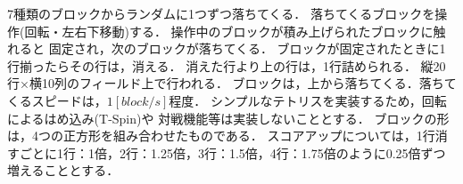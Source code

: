 7種類のブロックからランダムに1つずつ落ちてくる．
落ちてくるブロックを操作(回転・左右下移動)する．
操作中のブロックが積み上げられたブロックに触れると
固定され，次のブロックが落ちてくる．
ブロックが固定されたときに1行揃ったらその行は，消える．
消えた行より上の行は，1行詰められる．
縦20行×横10列のフィールド上で行われる．
ブロックは，上から落ちてくる．落ちてくるスピードは，$1[block/s]$程度．
シンプルなテトリスを実装するため，回転によるはめ込み(T-Spin)や
対戦機能等は実装しないこととする．
ブロックの形は，4つの正方形を組み合わせたものである．
スコアアップについては，1行消すごとに1行：1倍，2行：1.25倍，3行：1.5倍，4行：1.75倍のように0.25倍ずつ増えることとする．
